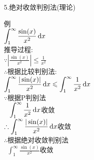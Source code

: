 5.绝对收敛判别法(理论)\\
\begin{center}
\end{center}
例\\
$\displaystyle\int_1^{\infty}\frac{\sin(x)}{x^2}\mathop{}\!\mathrm{d} x$\\
推导过程:\\
$\displaystyle\because|\frac{\sin(x)}{x^2}|\leqslant\frac{1}{x^2}$\\
$\therefore$根据比较判别法:\\
$\displaystyle\int_1^{\infty}\frac{|\sin(x)|}{x^2}\mathop{}\!\mathrm{d} x\leqslant\int_1^{\infty}\frac{1}{x^2}\mathop{}\!\mathrm{d} x$\\
$\because$根据P判别法\\
$\displaystyle\phantom{\because}\int_1^{\infty}\frac{1}{x^2}\mathop{}\!\mathrm{d} x$收敛\\[1ex]
$\displaystyle\therefore\int_1^{\infty}\frac{|\sin(x)|}{x^2}\mathop{}\!\mathrm{d} x$收敛\\
$\therefore$根据绝对收敛判别法\\
$\displaystyle\phantom{\therefore}\int_1^{\infty}\frac{\sin(x)}{x^2}$收敛
